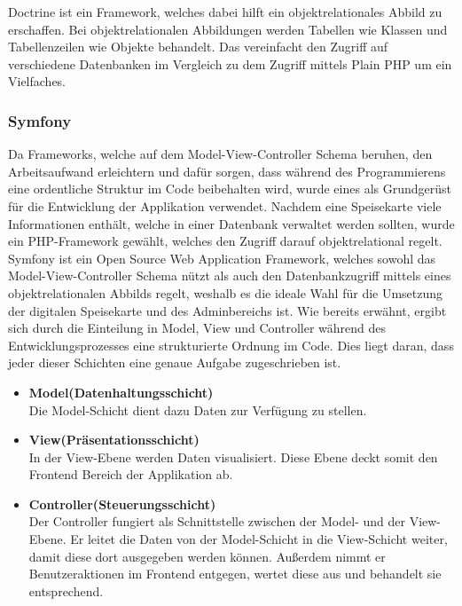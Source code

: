 {Doctrine\cite{doctrine}} ist ein Framework, welches dabei hilft ein objektrelationales Abbild zu erschaffen. Bei objektrelationalen Abbildungen werden Tabellen wie Klassen und Tabellenzeilen wie Objekte behandelt. Das vereinfacht den Zugriff auf verschiedene Datenbanken im Vergleich zu dem Zugriff mittels Plain PHP um ein Vielfaches.

    \subsubsection{Symfony}

Da Frameworks, welche auf dem Model-View-Controller Schema beruhen, den Arbeitsaufwand erleichtern und dafür sorgen, dass während des Programmierens eine ordentliche Struktur im Code beibehalten wird, wurde eines als Grundgerüst für die Entwicklung der Applikation verwendet. Nachdem eine Speisekarte viele Informationen enthält, welche in einer Datenbank verwaltet werden sollten, wurde ein PHP-Framework gewählt, welches den Zugriff darauf objektrelational regelt.
{Symfony\cite{symfony}} ist ein Open Source Web Application Framework, welches sowohl das Model-View-Controller Schema nützt als auch den Datenbankzugriff mittels eines objektrelationalen Abbilds regelt, weshalb es die ideale Wahl für die Umsetzung der digitalen Speisekarte und des Adminbereichs ist. 
Wie bereits erwähnt, ergibt sich durch die Einteilung in Model, View und Controller während des Entwicklungsprozesses eine strukturierte Ordnung im Code.
Dies liegt daran, dass jeder dieser Schichten eine genaue Aufgabe zugeschrieben ist.
\begin{itemize}
    \item \textbf{Model(Datenhaltungsschicht)}\\
Die Model-Schicht dient dazu Daten zur Verfügung zu stellen. 
    \item \textbf{View(Präsentationsschicht)}\\
In der View-Ebene werden Daten visualisiert. Diese Ebene deckt somit den Frontend Bereich der Applikation ab.
\pagebreak
    \item \textbf{Controller(Steuerungsschicht)}\\ 
Der Controller fungiert als Schnittstelle zwischen der Model- und der View-Ebene. Er leitet die Daten von der Model-Schicht in die View-Schicht weiter, damit diese dort ausgegeben werden können. Außerdem nimmt er Benutzeraktionen im Frontend entgegen, wertet diese aus und behandelt sie entsprechend.
  \end{itemize}  
